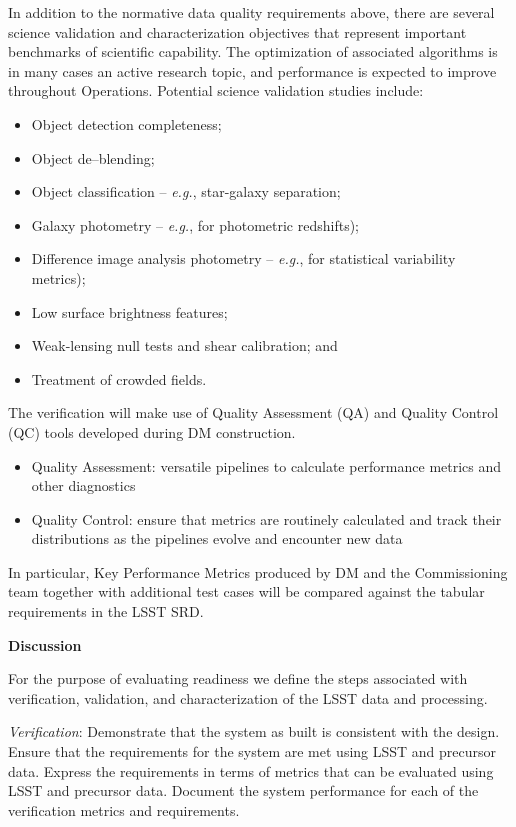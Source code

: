 In addition to the normative data quality requirements above, there are several science validation and characterization objectives that represent important benchmarks of scientific capability. The optimization of associated algorithms is in many cases an active research topic, and performance is expected to improve throughout Operations. Potential science validation studies include:

\begin{itemize}
	\item  Object detection completeness;
	\item  Object de--blending;
	\item  Object classification -- {\it e.g.}, star-galaxy separation;
	\item  Galaxy photometry -- {\it e.g.}, for photometric redshifts);
	\item  Difference image analysis photometry -- {\it e.g.}, for statistical variability metrics);
	\item  Low surface brightness features;
	\item  Weak-lensing null tests and shear calibration; and
	\item  Treatment of crowded fields.	
\end{itemize}

The verification will make use of Quality Assessment (QA) and Quality Control (QC) tools developed during DM construction.

\begin{itemize}
	\item Quality Assessment: versatile pipelines to calculate performance metrics and other diagnostics
	\item Quality Control: ensure that metrics are routinely calculated and track their distributions as the pipelines evolve and encounter new data	
\end{itemize}

In particular, Key Performance Metrics produced by DM and the Commissioning team together with additional test cases will be compared against the tabular requirements in the LSST SRD. 

\textbf{Discussion}

For the purpose of evaluating readiness we define the steps associated with verification, validation, and characterization of the LSST data and processing.

{\it Verification}: Demonstrate that the system as built is consistent with the design. Ensure that the requirements for the system are met using LSST and precursor data. Express the requirements in terms of metrics that can be evaluated using LSST and precursor data. Document the system performance for each of the verification metrics and requirements.


